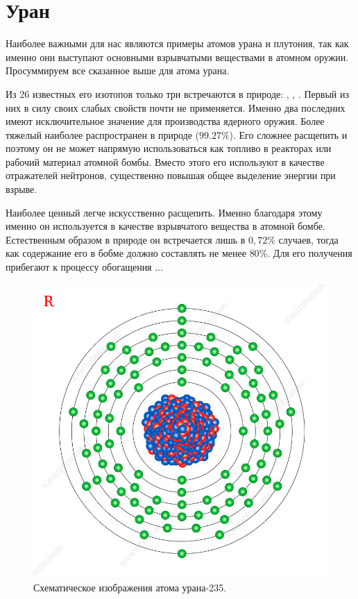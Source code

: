 \section*{Уран}

Наиболее важными для нас являются примеры атомов урана и плутония, так как именно они выступают основными взрывчатыми веществами в атомном оружии.
Просуммируем все сказанное выше для атома урана.

Из 26 известных его изотопов только три встречаются в природе: , , .
Первый из них в силу своих слабых свойств почти не применяется.
Именно два последних имеют исключительное значение для производства ядерного оружия.
Более тяжелый  наиболее распространен в природе ($99.27\%$).
Его сложнее расщепить и поэтому он не может напрямую использоваться как топливо в реакторах или рабочий материал атомной бомбы.
Вместо этого его используют в качестве отражателей нейтронов, существенно повышая общее выделение энергии при взрыве.

Наиболее ценный  легче искусственно расщепить.
Именно благодаря этому именно он используется в качестве взрывчатого вещества в атомной бомбе.
Естественным образом в природе он встречается лишь в $0,72\%$ случаев, тогда как содержание его в бобме должно составлять не менее $80\%$.
Для его получения прибегают к процессу обогащения ... 

\begin{figure}[t!]
   \centering
   \includegraphics[scale=0.6]{images/uranium_1}
   \caption{Схематическое изображения атома урана-235.}
   \label{fig:uranium_1}
\end{figure}

